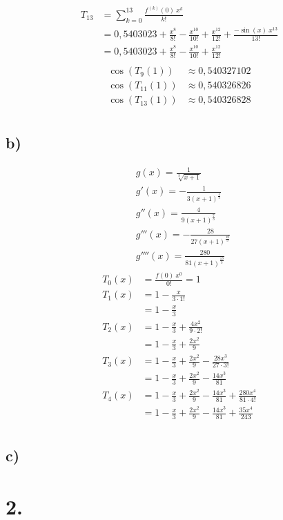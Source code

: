\documentclass[a4paper]{scrartcl}
\begin{document}
\begin{align}
T_{13}&=\sum_{k=0}^{13}\frac{f^{(k)}(0)\ x^k}{k!}\\
	&=0,5403023+\frac{x^8}{8!}-\frac{x^{10}}{10!}+\frac{x^{12}}{12!}+\frac{-\sin(x)\ x^{13}}{13!}\\
	&=0,5403023+\frac{x^8}{8!}-\frac{x^{10}}{10!}+\frac{x^{12}}{12!}\\
\end{align}
\begin{align}
\cos(T_9(1))&\approx 0,540327102\\
\cos(T_{11}(1))&\approx 0,540326826\\
\cos(T_{13}(1))&\approx 0,540326828\\
\end{align}
\subsection{b)}
\begin{align}
&g(x)=\frac{1}{\sqrt[3]{x+1}}\\
&g'(x)=-\frac{1}{3(x+1)^{\frac{4}{3}}}\\
&g''(x)=\frac{4}{9(x+1)^{\frac{7}{3}}}\\
&g'''(x)=-\frac{28}{27(x+1)^{\frac{10}{3}}}\\
&g''''(x)=\frac{280}{81(x+1)^{\frac{13}{3}}}
\end{align}
\begin{align}
T_0(x)&=\frac{f(0)\ x^0}{0!}=1\\
T_1(x)&=1-\frac{x}{3\cdot 1!}\\
	&=1-\frac{x}{3}\\
T_2(x)&=1-\frac{x}{3}+\frac{4x^2}{9\cdot 2!}\\
	&=1-\frac{x}{3}+\frac{2x^2}{9}\\
T_3(x)&=1-\frac{x}{3}+\frac{2x^2}{9}-\frac{28x^3}{27\cdot 3!}\\
	&=1-\frac{x}{3}+\frac{2x^2}{9}-\frac{14x^3}{81}\\
T_4(x)&=1-\frac{x}{3}+\frac{2x^2}{9}-\frac{14x^3}{81}+\frac{280x^4}{81\cdot 4!}\\
	&=1-\frac{x}{3}+\frac{2x^2}{9}-\frac{14x^3}{81}+\frac{35x^4}{243}\\
\end{align}
\subsection{c)}
\newpage
\section{2.}
\end{document}
